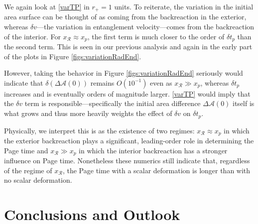 \documentclass[12pt,a4paper]{article}
\begin{document}
We again look at \eqref{varTP} in $r_+ = 1$ units. To reiterate, the variation in the initial area surface can be thought of as coming from the backreaction in the exterior, whereas $\delta v$---the variation in entanglement velocity---comes from the backreaction of the interior. For $x_\mathcal{R} \approx x_p$, the first term is much closer to the order of $\delta t_p$ than the second term. This is seen in our previous analysis and again in the early part of the plots in Figure \ref{figs:variationRadEnd}.

However, taking the behavior in Figure \ref{figs:variationRadEnd} seriously would indicate that $\delta(\Delta\mathcal{A}(0))$ remains $O(10^{-1})$ even as $x_\mathcal{R} \gg x_p$, whereas $\delta t_p$ increases and is eventually orders of magnitude larger. \eqref{varTP} would imply that the $\delta v$ term is responsible---specifically the initial area difference $\Delta\mathcal{A}(0)$ itself is what grows and thus more heavily weights the effect of $\delta v$ on $\delta t_p$.

Physically, we interpret this is as the existence of two regimes: $x_\mathcal{R} \approx x_p$ in which the exterior backreaction plays a significant, leading-order role in determining the Page time and $x_\mathcal{R} \gg x_p$ in which the interior backreaction has a stronger influence on Page time. Nonetheless these numerics still indicate that, regardless of the regime of $x_\mathcal{R}$, the Page time with a scalar deformation is longer than with no scalar deformation.

\section{Conclusions and Outlook} %
\end{document}
